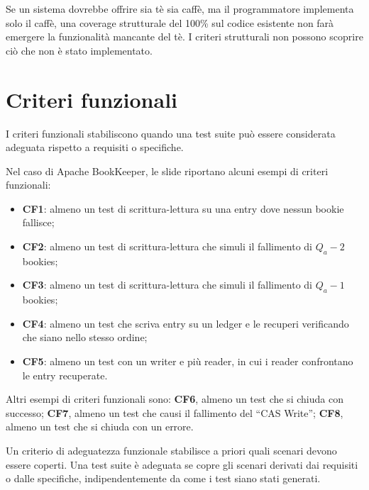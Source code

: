 \begin{notaprof}
Se un sistema dovrebbe offrire sia tè sia caffè, ma il programmatore implementa solo il caffè, una coverage strutturale del 100\% sul codice esistente non farà emergere la funzionalità mancante del tè. I criteri strutturali non possono scoprire ciò che non è stato implementato.
\end{notaprof}

\section{Criteri funzionali}

I criteri funzionali stabiliscono quando una test suite può essere considerata adeguata rispetto a requisiti o specifiche.

Nel caso di Apache BookKeeper, le slide riportano alcuni esempi di criteri funzionali:

\begin{itemize}
    \item \textbf{CF1}: almeno un test di scrittura-lettura su una entry dove nessun bookie fallisce;
    \item \textbf{CF2}: almeno un test di scrittura-lettura che simuli il fallimento di \(Q_a - 2\) bookies;
    \item \textbf{CF3}: almeno un test di scrittura-lettura che simuli il fallimento di \(Q_a - 1\) bookies;
    \item \textbf{CF4}: almeno un test che scriva entry su un ledger e le recuperi verificando che siano nello stesso ordine;
    \item \textbf{CF5}: almeno un test con un writer e più reader, in cui i reader confrontano le entry recuperate.
\end{itemize}

\begin{notaslide}
Altri esempi di criteri funzionali sono: \textbf{CF6}, almeno un test che si chiuda con successo; \textbf{CF7}, almeno un test che causi il fallimento del ``CAS Write''; \textbf{CF8}, almeno un test che si chiuda con un errore.
\end{notaslide}

\begin{notaprof}
Un criterio di adeguatezza funzionale stabilisce a priori quali scenari devono essere coperti. Una test suite è adeguata se copre gli scenari derivati dai requisiti o dalle specifiche, indipendentemente da come i test siano stati generati.
\end{notaprof}

